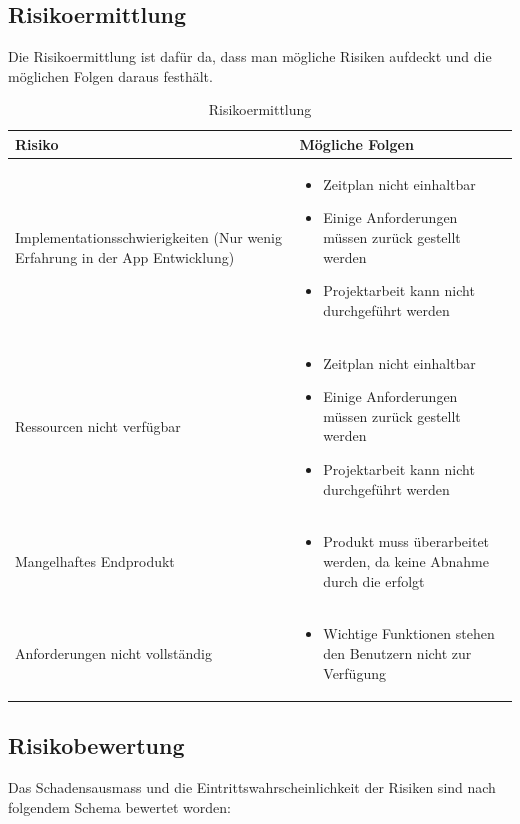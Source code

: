 \subsection{Risikoermittlung}\label{risikoermittlung}
Die Risikoermittlung ist dafür da, dass man mögliche Risiken aufdeckt und die möglichen Folgen daraus festhält.

\begin{table}[ht]
\centering
  \begin{tabular}{  p{5cm} | p{9cm} }
	\hline
	\rowcolor{gray}
	Risiko							&	Mögliche Folgen	\\ \hline
	Implementationsschwierigkeiten (Nur wenig Erfahrung in der App Entwicklung)
								&	\begin{itemize}
										\item Zeitplan nicht einhaltbar
										\item Einige Anforderungen müssen zurück gestellt werden
										\item Projektarbeit kann nicht durchgeführt werden
									\end{itemize}	\\ \hline
	Ressourcen nicht verfügbar
								&	\begin{itemize}
										\item Zeitplan nicht einhaltbar
										\item Einige Anforderungen müssen zurück gestellt werden
										\item Projektarbeit kann nicht durchgeführt werden
									\end{itemize}	\\ \hline
	Mangelhaftes Endprodukt		
								&	\begin{itemize}
										\item Produkt muss überarbeitet werden, da keine Abnahme durch die \glossarmark{Stakeholder} erfolgt
									\end{itemize}	\\ \hline	
	Anforderungen nicht vollständig	
								&	\begin{itemize}
										\item Wichtige Funktionen stehen den Benutzern nicht zur Verfügung
									\end{itemize}	\\ \hline			
  \end{tabular}
   \caption{Risikoermittlung}
\end{table}

\subsection{Risikobewertung}
Das Schadensausmass und die Eintrittswahrscheinlichkeit der Risiken sind nach folgendem Schema bewertet worden:

